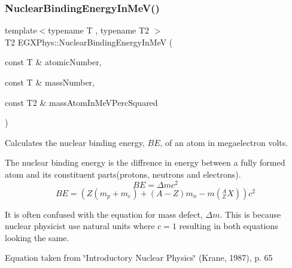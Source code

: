 \subsubsection{\texorpdfstring{Nuclear\+Binding\+Energy\+In\+Me\+V()}{NuclearBindingEnergyInMeV()}}
{\footnotesize\ttfamily template$<$typename T , typename T2 $>$ \\
T2 E\+G\+X\+Phys\+::\+Nuclear\+Binding\+Energy\+In\+MeV (\begin{DoxyParamCaption}\item[{const T \&}]{atomic\+Number,  }\item[{const T \&}]{mass\+Number,  }\item[{const T2 \&}]{mass\+Atom\+In\+Me\+V\+Perc\+Squared }\end{DoxyParamCaption})}



Calculates the nuclear binding energy, $BE$, of an atom in megaelectron volts. 

The nuclear binding energy is the diffrence in energy between a fully formed atom and its constituent parts(protons, neutrons and electrons). \[BE = \Delta m c^2\] \[BE = \left (Z(m_p + m_e)+(A-Z)m_n - m({^A_ZX}) \right ) c^2\]

It is often confused with the equation for mass defect, $\Delta m$. This is because nuclear physicist use natural units where $c = 1$ resulting in both equations looking the same.

Equation taken from \char`\"{}\+Introductory Nuclear Physics\char`\"{} (Krane, 1987), p. 65


